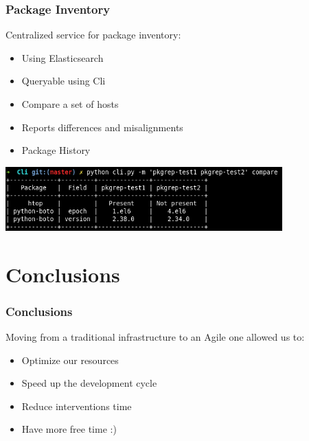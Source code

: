 \documentclass[aspectratio=169]{beamer}
\begin{document}
\begin{frame}
    \frametitle{Package Inventory}
    \begin{minipage}[t]{0.95\textwidth}
        Centralized service for package inventory:
        \begin{itemize}
            \item Using Elasticsearch
            \item Queryable using Cli
            \item Compare a set of hosts
            \item Reports differences and misalignments
            \item Package History
        \end{itemize}
    \end{minipage}
    \vspace{\belowdisplayskip}
    \vspace{\belowdisplayskip}
    \begin{minipage}[t]{0.95\textwidth}
        \begin{center}
            \includegraphics[width=0.8\textwidth]{pkginv_demo.png}
        \end{center}
    \end{minipage}

\end{frame}

\section{Conclusions}

\begin{frame}
    \frametitle{Conclusions}
    Moving from a traditional infrastructure to an Agile one allowed us to:
    \begin{itemize}
        \item Optimize our resources
        \item Speed up the development cycle
        \item Reduce interventions time
        \item Have more free time :)
    \end{itemize}
\end{frame}
\end{document}
